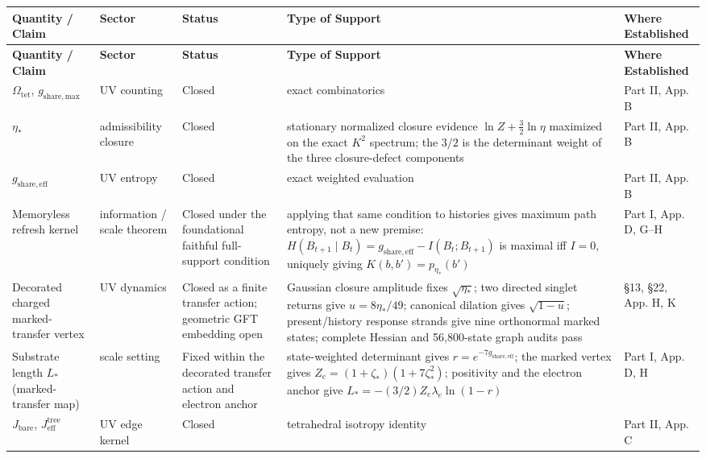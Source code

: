 \documentclass[11pt]{article}
\begin{document}
\begingroup
\scriptsize
\setlength{\tabcolsep}{3pt}
\renewcommand{\arraystretch}{1.12}
\begin{longtable}{|L{0.18\textwidth}|L{0.13\textwidth}|L{0.16\textwidth}|L{0.33\textwidth}|L{0.13\textwidth}|}
\hline
\textbf{Quantity / Claim} & \textbf{Sector} & \textbf{Status} & \textbf{Type of Support} & \textbf{Where Established} \\
\hline
\endfirsthead
\hline
\textbf{Quantity / Claim} & \textbf{Sector} & \textbf{Status} & \textbf{Type of Support} & \textbf{Where Established} \\
\hline
\endhead
$\Omega_{\mathrm{tet}}$, $g_{\mathrm{share,max}}$ & UV counting & Closed & exact combinatorics & Part II, App. B \\
\hline
$\eta_*$ & admissibility closure & Closed & stationary normalized closure evidence $\ln Z+\tfrac32\ln\eta$ maximized on the exact $K^2$ spectrum; the $3/2$ is the determinant weight of the three closure-defect components & Part II, App. B \\
\hline
$g_{\mathrm{share,eff}}$ & UV entropy & Closed & exact weighted evaluation & Part II, App. B \\
\hline
Memoryless refresh kernel & information / scale theorem & Closed under the foundational faithful full-support condition & applying that same condition to histories gives maximum path entropy, not a new premise: $H(B_{t+1}\mid B_t)=g_{\mathrm{share,eff}}-I(B_t;B_{t+1})$ is maximal iff $I=0$, uniquely giving $K(b,b')=p_{\eta_*}(b')$ & Part I, App. D, G--H \\
\hline
Decorated charged marked-transfer vertex & UV dynamics & Closed as a finite transfer action; geometric GFT embedding open & Gaussian closure amplitude fixes $\sqrt{\eta_*}$; two directed singlet returns give $u=8\eta_*/49$; canonical dilation gives $\sqrt{1-u}$; present/history response strands give nine orthonormal marked states; complete Hessian and 56,800-state graph audits pass & \S13, \S22, App. H, K \\
\hline
Substrate length $L_*$ (marked-transfer map) & scale setting & Fixed within the decorated transfer action and electron anchor & state-weighted determinant gives $r=e^{-7g_{\mathrm{share,eff}}}$; the marked vertex gives $Z_e=(1+\zeta_*)(1+7\zeta_*^2)$; positivity and the electron anchor give $L_*=-(3/2)Z_e\lambda_e\ln(1-r)$ & Part I, App. D, H \\
\hline
$J_{\mathrm{bare}}$, $J_{\mathrm{eff}}^{\mathrm{tree}}$ & UV edge kernel & Closed & tetrahedral isotropy identity & Part II, App. C \\

\end{longtable}
\end{document}
